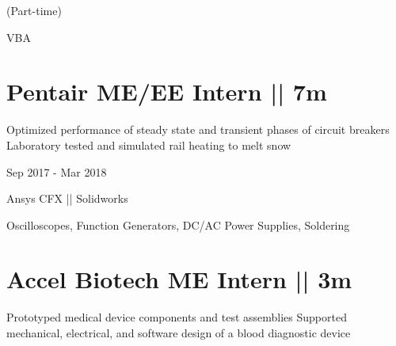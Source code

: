 \documentclass[letterpaper,10pt,oneside]{article}
\begin{document}
\begin{body}
\begin{subtitle}
\vspace{-2.0ex}
{{(Part-time)}} 
\end{subtitle}

\vspace{-4ex}
{
\vspace{1.8ex}
\color{cyan}\small
{VBA} %
}
\vspace{-1.5ex}

\section
{\textbf{Pentair}
\newline
ME/EE Intern  || 7m}

\BulletItem
\vspace{-2.5ex}
\begin{detail}

\BulletItem
 Optimized performance of steady state and transient phases of circuit breakers
\BulletItem
 Laboratory tested and simulated rail heating to melt snow
\end{detail}

\begin{subtitle}
\vspace{-7.8ex}
{{Sep 2017 - Mar 2018}}
\end{subtitle}
\vspace{0ex}

\vspace{-1.5ex}
{
\vspace{1.8ex}
\color{cyan}\small
{Ansys CFX || Solidworks} %
}

{
\vspace{-0.3ex}
\color{cyan}\small
{Oscilloscopes, Function Generators, DC/AC Power Supplies, Soldering} %
}
\vspace{-1.5ex}


\section
{\textbf{Accel Biotech}
\newline
ME Intern || 3m}

\BulletItem
\vspace{-2.5ex}
\begin{detail}
\BulletItem
Prototyped medical device components and test assemblies
\BulletItem
Supported mechanical, electrical, and software design of a blood diagnostic device
\end{detail}


\end{body}
\end{document}
